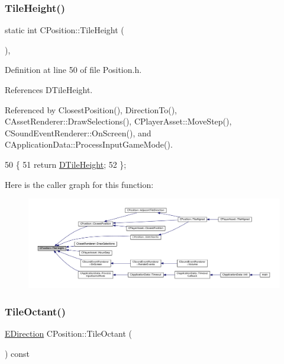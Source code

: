 \subsubsection{\texorpdfstring{Tile\+Height()}{TileHeight()}}
{\footnotesize\ttfamily static int C\+Position\+::\+Tile\+Height (\begin{DoxyParamCaption}{ }\end{DoxyParamCaption})\hspace{0.3cm}{\ttfamily [inline]}, {\ttfamily [static]}}



Definition at line 50 of file Position.\+h.



References D\+Tile\+Height.



Referenced by Closest\+Position(), Direction\+To(), C\+Asset\+Renderer\+::\+Draw\+Selections(), C\+Player\+Asset\+::\+Move\+Step(), C\+Sound\+Event\+Renderer\+::\+On\+Screen(), and C\+Application\+Data\+::\+Process\+Input\+Game\+Mode().


\begin{DoxyCode}
50                                \{
51             \textcolor{keywordflow}{return} \hyperlink{classCPosition_a202ebb83e86df75cfb76cf1241ba817c}{DTileHeight};  
52         \};
\end{DoxyCode}
Here is the caller graph for this function\+:\nopagebreak
\begin{figure}[H]
\begin{center}
\leavevmode
\includegraphics[width=350pt]{classCPosition_ac4f0edd9c9632f1bdca981ef5d9b71e5_icgraph}
\end{center}
\end{figure}
\hypertarget{classCPosition_a6acbc9445751b0a040c2971720f00088}{}\label{classCPosition_a6acbc9445751b0a040c2971720f00088} 
\subsubsection{\texorpdfstring{Tile\+Octant()}{TileOctant()}}
{\footnotesize\ttfamily \hyperlink{GameDataTypes_8h_acb2b033915f6659a71a38b5aa6e4eb42}{E\+Direction} C\+Position\+::\+Tile\+Octant (\begin{DoxyParamCaption}{ }\end{DoxyParamCaption}) const}



